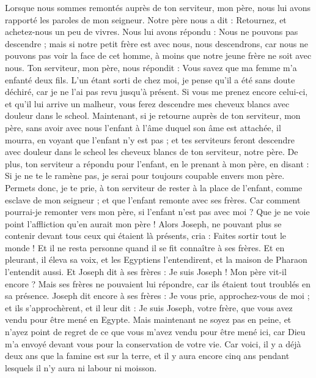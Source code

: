 \begin{multicols}{2}
Lorsque nous sommes remontés auprès de ton serviteur, mon père, nous lui avons rapporté les paroles de mon seigneur.
Notre père nous a dit : Retournez, et achetez-nous un peu de vivres.
Nous lui avons répondu : Nous ne pouvons pas descendre ; mais si notre petit frère est avec nous, nous descendrons, car nous ne pouvons pas voir la face de cet homme, à moins que notre jeune frère ne soit avec nous.
Ton serviteur, mon père, nous répondit : Vous savez que ma femme m'a enfanté deux fils.
L’un étant sorti de chez moi, je pense qu’il a été sans doute déchiré, car je ne l’ai pas revu jusqu’à présent.
Si vous me prenez encore celui-ci, et qu’il lui arrive un malheur, vous ferez descendre mes cheveux blancs avec douleur dans le scheol.
Maintenant, si je retourne auprès de ton serviteur, mon père, sans avoir avec nous l’enfant à l’âme duquel son âme est attachée,
il mourra, en voyant que l’enfant n’y est pas ; et tes serviteurs feront descendre avec douleur dans le scheol les cheveux blancs de ton serviteur, notre père.
De plus, ton serviteur a répondu pour l'enfant, en le prenant à mon père, en disant : Si je ne te le ramène pas, je serai pour toujours coupable envers mon père.
Permets donc, je te prie, à ton serviteur de rester à la place de l’enfant, comme esclave de mon seigneur ; et que l’enfant remonte avec ses frères.
Car comment pourrai-je remonter vers mon père, si l'enfant n'est pas avec moi ? Que je ne voie point l'affliction qu'en aurait mon père !
\VerseOne{}Alors Joseph, ne pouvant plus se contenir devant tous ceux qui étaient là présents, cria : Faites sortir tout le monde ! Et il ne resta personne quand il se fit connaître à ses frères.
Et en pleurant, il éleva sa voix, et les Egyptiens l'entendirent, et la maison de Pharaon l'entendit aussi.
Et Joseph dit à ses frères : Je suis Joseph ! Mon père vit-il encore ? Mais ses frères ne pouvaient lui répondre, car ils étaient tout troublés en sa présence.
Joseph dit encore à ses frères : Je vous prie, approchez-vous de moi ; et ils s'approchèrent, et il leur dit : Je suis Joseph, votre frère, que vous avez vendu pour être mené en Egypte.
Mais maintenant ne soyez pas en peine, et n'ayez point de regret de ce que vous m'avez vendu pour être mené ici, car Dieu m'a envoyé devant vous pour la conservation de votre vie.
Car voici, il y a déjà deux ans que la famine est sur la terre, et il y aura encore cinq ans pendant lesquels il n'y aura ni labour ni moisson.

\end{multicols}
